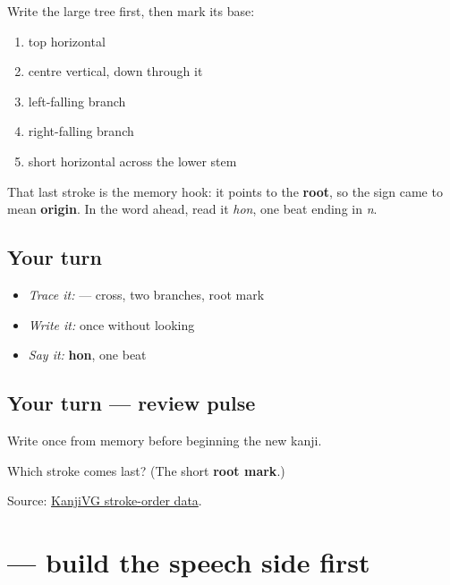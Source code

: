 \begin{quote}
\end{quote}

Write the large tree first, then mark its base:

\begin{enumerate}
\raggedright
  \item top horizontal
  \item centre vertical, down through it
  \item left-falling branch
  \item right-falling branch
  \item short horizontal across the lower stem
\end{enumerate}

That last stroke is the memory hook: it points to the \textbf{root}, so the sign came to mean \textbf{origin}. In the word ahead, read it \emph{hon}, one beat ending in \emph{n}.

\subsection*{Your turn}
\begin{itemize}
\raggedright
  \item \emph{Trace it:}  — cross, two branches, root mark
  \item \emph{Write it:}  once without looking
  \item \emph{Say it:} \textbf{hon}, one beat
\end{itemize}

\subsection*{Your turn — review pulse}
Write \textbf{} once from memory before beginning the new kanji.

\begin{tcolorbox}[breakable,colback=teal!4,colframe=teal!35!black,title={Before you move on}]
Which stroke comes last? (The short \textbf{root mark}.)

Source: \href{https://kanjivg.tagaini.net/kanjivg/kanji/0672c.html}{KanjiVG stroke-order data}.
\end{tcolorbox}
\section[\texorpdfstring{\ja{言} (gen)}{言 (gen)}]{ — build the speech side first}

